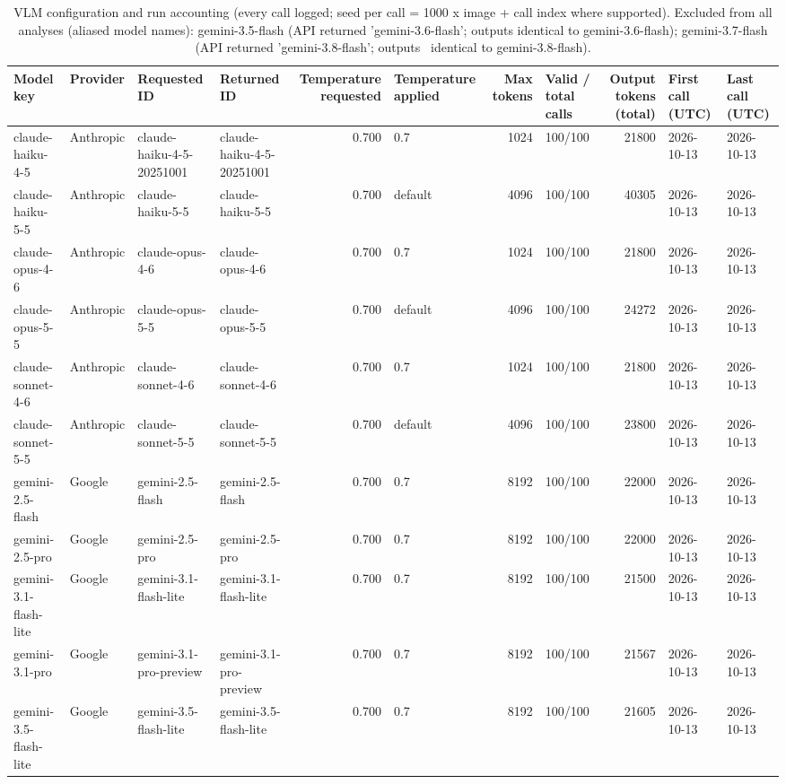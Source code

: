 \begin{table}
\caption{VLM configuration and run accounting (every call logged; seed per call = 1000 x image + call index where supported). Excluded from all analyses (aliased model names): gemini-3.5-flash (API returned 'gemini-3.6-flash'; outputs identical to gemini-3.6-flash); gemini-3.7-flash (API returned 'gemini-3.8-flash'; outputs ~identical to gemini-3.8-flash).}
\begin{tabular}{llllrlrlrll}
\toprule
Model key & Provider & Requested ID & Returned ID & Temperature requested & Temperature applied & Max tokens & Valid / total calls & Output tokens (total) & First call (UTC) & Last call (UTC) \\
\midrule
claude-haiku-4-5 & Anthropic & claude-haiku-4-5-20251001 & claude-haiku-4-5-20251001 & 0.700 & 0.7 & 1024 & 100/100 & 21800 & 2026-10-13 & 2026-10-13 \\
claude-haiku-5-5 & Anthropic & claude-haiku-5-5 & claude-haiku-5-5 & 0.700 & default & 4096 & 100/100 & 40305 & 2026-10-13 & 2026-10-13 \\
claude-opus-4-6 & Anthropic & claude-opus-4-6 & claude-opus-4-6 & 0.700 & 0.7 & 1024 & 100/100 & 21800 & 2026-10-13 & 2026-10-13 \\
claude-opus-5-5 & Anthropic & claude-opus-5-5 & claude-opus-5-5 & 0.700 & default & 4096 & 100/100 & 24272 & 2026-10-13 & 2026-10-13 \\
claude-sonnet-4-6 & Anthropic & claude-sonnet-4-6 & claude-sonnet-4-6 & 0.700 & 0.7 & 1024 & 100/100 & 21800 & 2026-10-13 & 2026-10-13 \\
claude-sonnet-5-5 & Anthropic & claude-sonnet-5-5 & claude-sonnet-5-5 & 0.700 & default & 4096 & 100/100 & 23800 & 2026-10-13 & 2026-10-13 \\
gemini-2.5-flash & Google & gemini-2.5-flash & gemini-2.5-flash & 0.700 & 0.7 & 8192 & 100/100 & 22000 & 2026-10-13 & 2026-10-13 \\
gemini-2.5-pro & Google & gemini-2.5-pro & gemini-2.5-pro & 0.700 & 0.7 & 8192 & 100/100 & 22000 & 2026-10-13 & 2026-10-13 \\
gemini-3.1-flash-lite & Google & gemini-3.1-flash-lite & gemini-3.1-flash-lite & 0.700 & 0.7 & 8192 & 100/100 & 21500 & 2026-10-13 & 2026-10-13 \\
gemini-3.1-pro & Google & gemini-3.1-pro-preview & gemini-3.1-pro-preview & 0.700 & 0.7 & 8192 & 100/100 & 21567 & 2026-10-13 & 2026-10-13 \\
gemini-3.5-flash-lite & Google & gemini-3.5-flash-lite & gemini-3.5-flash-lite & 0.700 & 0.7 & 8192 & 100/100 & 21605 & 2026-10-13 & 2026-10-13 \\

\end{tabular}
\end{table}

